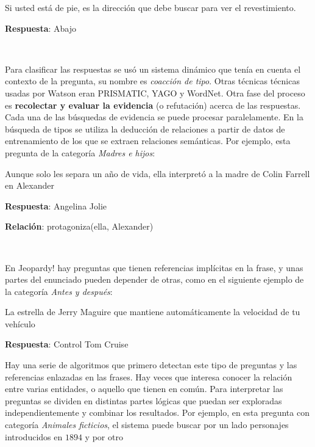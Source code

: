 \documentclass[paper=a4, fontsize=10pt]{scrartcl} %
\numberwithin{equation}{section} %
\numberwithin{figure}{section} %
\numberwithin{table}{section} %
\begin{document}
\begin{center}
Si usted está de pie, es la dirección que debe buscar para ver el revestimiento.

\textbf{Respuesta}: Abajo
\end{center}

\

Para clasificar las respuestas se usó un sistema dinámico que tenía en cuenta el contexto de la pregunta, su nombre es \textit{coacción de tipo}. %
Otras técnicas técnicas usadas por Watson eran PRISMATIC, YAGO y WordNet. %
Otra fase del proceso es \textbf{recolectar y evaluar la evidencia} (o refutación) acerca de las respuestas. 
Cada una de las búsquedas de evidencia se puede procesar paralelamente.
En la búsqueda de tipos se utiliza la deducción de relaciones a partir de datos de entrenamiento de los que se extraen relaciones semánticas. Por ejemplo, esta pregunta de la categoría \textit{Madres e hijos}:

\begin{center}
Aunque solo les separa un año de vida, ella interpretó a la madre de Colin Farrell en Alexander

\textbf{Respuesta}: Angelina Jolie

\textbf{Relación}: protagoniza(ella, Alexander)
\end{center}

\

En Jeopardy! hay preguntas que tienen referencias implícitas en la frase, y unas partes del enunciado pueden depender de otras, como en el siguiente ejemplo de la categoría \textit{Antes y después}:

\begin{center}
La estrella de Jerry Maguire que mantiene automáticamente la velocidad de tu vehículo

\textbf{Respuesta}: Control Tom Cruise
\end{center} 

Hay una serie de algoritmos que primero detectan este tipo de preguntas y las referencias enlazadas en las frases.
Hay veces que interesa conocer la relación entre varias entidades, o aquello que tienen en común.
Para interpretar las preguntas se dividen en distintas partes lógicas que puedan ser exploradas independientemente y combinar los resultados. %
Por ejemplo, en esta pregunta con categoría \textit{Animales ficticios}, el sistema puede buscar por un lado personajes introducidos en $1894$ y por otro 
\end{document}

